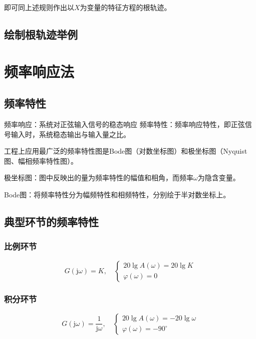 \documentclass[cn, blue, normal, 12pt]{elegantnote}
\begin{document}
即可同上述规则作出以$X$为变量的特征方程的根轨迹。

\subsection{绘制根轨迹举例}



\section{频率响应法}

\subsection{频率特性}

频率响应：系统对正弦输入信号的稳态响应
频率特性：频率响应特性，即正弦信号输入时，系统稳态输出与输入量之比。

工程上应用最广泛的频率特性图是Bode图（对数坐标图）和极坐标图（Nyquist图、幅相频率特性图）。

极坐标图：图中反映出的量为频率特性的幅值和相角，而频率$\omega$为隐含变量。

Bode图：将频率特性分为幅频特性和相频特性，分别绘于半对数坐标上。

\subsection{典型环节的频率特性}

\subsubsection{比例环节}

\begin{equation}
    G(\mathrm{j}\omega)=K, \quad 
    \left\{
        \begin{array}{l}
            20\lg{A(\omega)}=20\lg{K} \\
            \varphi(\omega)=0
        \end{array}
    \right.
\end{equation}

\subsubsection{积分环节}

\begin{equation}
    G(\mathrm{j}\omega)=\frac{1}{\mathrm{j}\omega}, \quad 
    \left\{
        \begin{array}{l}
            20\lg{A(\omega)}=-20\lg{\omega} \\
            \varphi(\omega)=-90^{\circ}
        \end{array}
    \right.
\end{equation}
\end{document}
